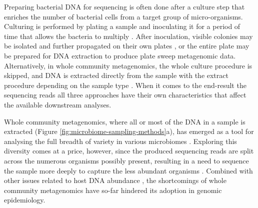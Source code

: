 \documentclass[officiallayout]{tktla}
\begin{document}
Preparing bacterial DNA for sequencing is often done after a culture
step that enriches the number of bacterial cells from a target group
of micro-organisms. Culturing is performed by plating a sample and
inoculating it for a period of time that allows the bacteria to
multiply \citep{sanders2012aseptic}. After inoculation, visible
colonies may be isolated and further propagated on their own plates
\citep{sanders2012aseptic}, or the entire plate may be prepared for DNA
extraction to produce plate sweep metagenomic data. Alternatively, in
whole community metagenomics, the whole culture procedure is skipped, and DNA is
extracted directly from the sample with the extract procedure
depending on the sample type \citep{bachmann2018advances}. When it
comes to the end-result \textemdash{ } the sequencing reads
\textemdash{ } all three approaches have their own characteristics
that affect the available downstream analyses.

Whole community metagenomics, where all or most of the DNA in a sample is
extracted (Figure \ref{fig:microbiome-sampling-methods}a), has emerged
as a tool for analysing the full breadth of variety in various
microbiomes \citep{shao2019stunted, ghensi2020strong,
  bertrand2019hybrid, danko2021global, whelan2020culture}. Exploring
this diversity comes at a price, however, since the produced
sequencing reads are split across the numerous organisms possibly
present, resulting in a need to sequence the sample more deeply to
capture the less abundant organisms \citep{whelan2020culture,
  vollmers2017comparing, quince2017shotgun}. Combined with other
issues related to host DNA abundance \citep{whelan2020culture, ivy2018direct, gu2019clinical}, the shortcomings of whole community metagenomics have
so-far hindered its adoption in genomic epidemiology.
\end{document}
